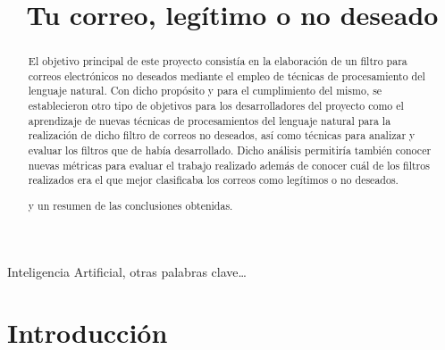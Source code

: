 \documentclass[conference,a4paper]{IEEEtran}
\begin{document}
\title{Tu correo, legítimo o no deseado}

\author{
  
  \and
  
}

\maketitle


\begin{abstract}
  El objetivo principal de este proyecto consistía en la elaboración de un filtro para correos electrónicos no deseados mediante el empleo de técnicas de procesamiento del lenguaje natural. Con dicho propósito y para el cumplimiento del mismo, se establecieron otro tipo de objetivos para los desarrolladores del proyecto como el aprendizaje de nuevas técnicas de procesamientos del lenguaje natural para la realización de dicho filtro de correos no deseados, así como técnicas para analizar y evaluar los filtros que de había desarrollado. Dicho análisis permitiría también conocer nuevas métricas para evaluar el trabajo realizado además de conocer cuál de los filtros realizados era el que mejor clasificaba los correos como legítimos o no deseados.
  
  
   y un
  resumen de las conclusiones obtenidas. 
\end{abstract}


\begin{IEEEkeywords}
  Inteligencia Artificial, otras palabras clave…
\end{IEEEkeywords}


\section{Introducción}
\end{document}
